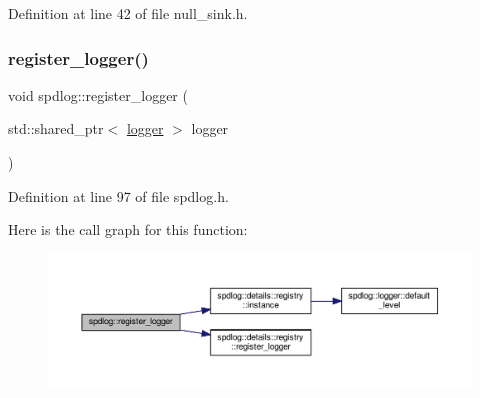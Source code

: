 Definition at line 42 of file null\+\_\+sink.\+h.

\mbox{\label{namespacespdlog_a306f1c2ef42ba046620bd84266ee5b24}} 
\subsubsection{\texorpdfstring{register\+\_\+logger()}{register\_logger()}}
{\footnotesize\ttfamily void spdlog\+::register\+\_\+logger (\begin{DoxyParamCaption}\item[{std\+::shared\+\_\+ptr$<$ \hyperlink{classspdlog_1_1logger}{logger} $>$}]{logger }\end{DoxyParamCaption})\hspace{0.3cm}{\ttfamily [inline]}}



Definition at line 97 of file spdlog.\+h.

Here is the call graph for this function\+:
\nopagebreak
\begin{figure}[H]
\begin{center}
\leavevmode
\includegraphics[width=350pt]{namespacespdlog_a306f1c2ef42ba046620bd84266ee5b24_cgraph}
\end{center}
\end{figure}
\mbox{\label{namespacespdlog_a42401c73c1dede7000852f7229b7aa9c}} 
